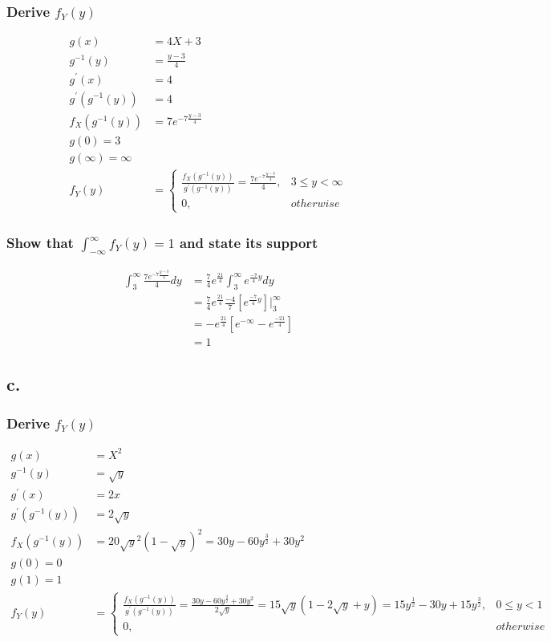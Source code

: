 \documentclass[12pt]{article}
\begin{document}
\subsubsection*{Derive $f_Y(y)$}
\begin{align*}
  g(x) &= 4X + 3 \\
  g^{-1}(y) &= \frac{y-3}{4} \\
  g^{'}(x) &= 4 \\
  g^{'}(g^{-1}(y)) &= 4 \\
  f_X(g^{-1}(y)) &= 7e^{-7\frac{y-3}{4}} \\
  g(0) = 3 \\
  g(\infty) = \infty \\
  f_Y(y) &= 
  \begin{cases}
    \frac{f_X(g^{-1}(y))}{g^{'}(g^{-1}(y))} 
    = \frac{7e^{-7\frac{y-3}{4}}}{4}, & 3 \leq y < \infty \\
    0, & otherwise
  \end{cases}
\end{align*}

\subsubsection*{Show that $\int_{-\infty}^\infty f_Y(y) = 1$ and state its support}
\begin{align*}
  \int_3^\infty \frac{7e^{-7\frac{y-3}{4}}}{4}dy
  &= \frac{7}{4}e^{\frac{21}{4}}\int_3^\infty e^{\frac{-7}{4}y}dy \\
  &= \frac{7}{4}e^{\frac{21}{4}}\frac{-4}{7}\left[e^{\frac{-7}{4}y} \right]\big|_3^\infty \\
  &= -e^{\frac{21}{4}}\left[ e^{-\infty} - e^{\frac{-21}{4}}  \right] \\
  &= 1
\end{align*}

\subsection*{c.}

\subsubsection*{Derive $f_Y(y)$}
\begin{align*}
  g(x) &= X^2 \\
  g^{-1}(y) &= \sqrt{y} \\
  g^{'}(x) &= 2x \\
  g^{'}(g^{-1}(y)) &= 2\sqrt{y} \\
  f_X(g^{-1}(y)) &= 20\sqrt{y}^2(1-\sqrt{y})^2 = 30y - 60y^{\frac{3}{2}} + 30y^2 \\
  g(0) = 0 \\
  g(1) = 1 \\
  f_Y(y) &= 
  \begin{cases}
    \frac{f_X(g^{-1}(y))}{g^{'}(g^{-1}(y))} 
    = \frac{30y - 60y^{\frac{3}{2}} + 30y^2}{2\sqrt{y}}
    = 15\sqrt{y}(1-2\sqrt{y} + y) 
    = 15y^{\frac{1}{2}}-30y+15y^{\frac{3}{2}}, & 0 \leq y < 1 \\
    0, & otherwise
  \end{cases}
\end{align*}
\end{document}
